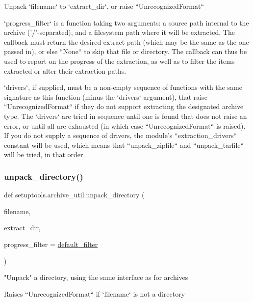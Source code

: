 \begin{DoxyVerb}Unpack `filename` to `extract_dir`, or raise ``UnrecognizedFormat``

`progress_filter` is a function taking two arguments: a source path
internal to the archive ('/'-separated), and a filesystem path where it
will be extracted.  The callback must return the desired extract path
(which may be the same as the one passed in), or else ``None`` to skip
that file or directory.  The callback can thus be used to report on the
progress of the extraction, as well as to filter the items extracted or
alter their extraction paths.

`drivers`, if supplied, must be a non-empty sequence of functions with the
same signature as this function (minus the `drivers` argument), that raise
``UnrecognizedFormat`` if they do not support extracting the designated
archive type.  The `drivers` are tried in sequence until one is found that
does not raise an error, or until all are exhausted (in which case
``UnrecognizedFormat`` is raised).  If you do not supply a sequence of
drivers, the module's ``extraction_drivers`` constant will be used, which
means that ``unpack_zipfile`` and ``unpack_tarfile`` will be tried, in that
order.
\end{DoxyVerb}
 \mbox{\label{namespacesetuptools_1_1archive__util_a6ad75ce90d1cbed27a1d5a1dc6e4dda3}} 
\subsubsection{\texorpdfstring{unpack\+\_\+directory()}{unpack\_directory()}}
{\footnotesize\ttfamily def setuptools.\+archive\+\_\+util.\+unpack\+\_\+directory (\begin{DoxyParamCaption}\item[{}]{filename,  }\item[{}]{extract\+\_\+dir,  }\item[{}]{progress\+\_\+filter = {\ttfamily \hyperlink{namespacesetuptools_1_1archive__util_adede8e93e57be04915ea0d27831b654b}{default\+\_\+filter}} }\end{DoxyParamCaption})}

\begin{DoxyVerb}"Unpack" a directory, using the same interface as for archives

Raises ``UnrecognizedFormat`` if `filename` is not a directory
\end{DoxyVerb}
 \mbox{\label{namespacesetuptools_1_1archive__util_aee037d06b845eaf69e229fafccae35b9}} 
